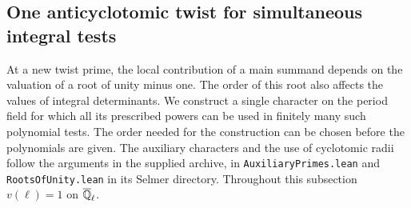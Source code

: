 \documentclass[a4paper,11pt]{article}
\theoremstyle{definition}
\theoremstyle{remark}
\numberwithin{equation}{section}
\begin{document}
\subsection{One anticyclotomic twist for simultaneous integral tests}
\label{sec:rayinterpolation726}

At a new twist prime, the local contribution of a main summand depends
on the valuation of a root of unity minus one. The order of this root
also affects the values of integral determinants. We construct a single
character on the period field for which all its prescribed powers can
be used in finitely many such polynomial tests. The order needed for
the construction can be chosen before the polynomials are given.
The auxiliary characters and the use of cyclotomic radii follow the
arguments in the supplied archive, in \texttt{AuxiliaryPrimes.lean}
and \texttt{RootsOfUnity.lean} in its Selmer directory.
Throughout this subsection \(v(\ell)=1\) on \(\overline{\mathbb Q}_\ell\).
\end{document}
